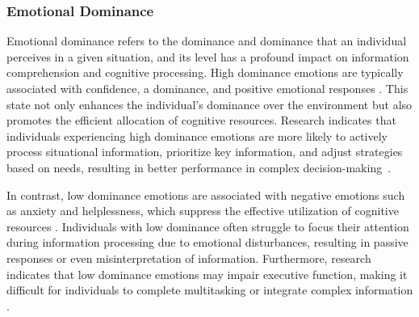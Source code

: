 \subsubsection{Emotional Dominance}
Emotional dominance refers to the dominance and dominance that an individual perceives in a given situation, and its level has a profound impact on information comprehension and cognitive processing. High dominance emotions are typically associated with confidence, a dominance, and positive emotional responses \cite{betella2016affective}. This state not only enhances the individual’s dominance over the environment but also promotes the efficient allocation of cognitive resources. Research indicates that individuals experiencing high dominance emotions are more likely to actively process situational information, prioritize key information, and adjust strategies based on needs, resulting in better performance in complex decision-making~\cite{mehrabian1996pleasure}.

In contrast, low dominance emotions are associated with negative emotions such as anxiety and helplessness, which suppress the effective utilization of cognitive resources \cite{kurth2010link}. Individuals with low dominance often struggle to focus their attention during information processing due to emotional disturbances, resulting in passive responses or even misinterpretation of information. Furthermore, research indicates that low dominance emotions may impair executive function, making it difficult for individuals to complete multitasking or integrate complex information \cite{gross1998emerging}.

